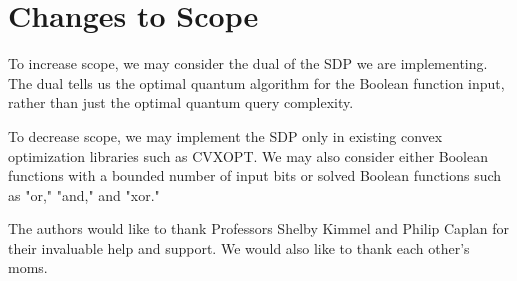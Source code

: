 \section{Changes to Scope}

To increase scope, we may consider the dual of the SDP
we are implementing.
The dual tells us the optimal quantum algorithm for the Boolean
function input, rather than just the optimal quantum query complexity.

To decrease scope, we may implement the SDP only in existing
convex optimization libraries such as CVXOPT.
We may also consider either Boolean functions with a bounded
number of input bits or solved Boolean functions such as "or,"
"and," and "xor."

\begin{acks}
The authors would like to thank Professors Shelby Kimmel
and Philip Caplan for their invaluable help and support. 
We would also like to thank each other's moms.
\end{acks}